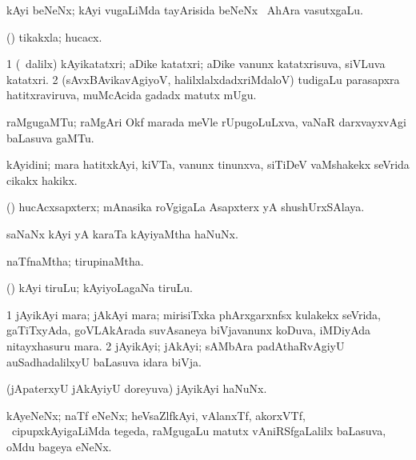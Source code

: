 \bentry
{}
\gl{\nA}
\bmng
kAyi beNeNx; kAyi \mo vugaLiMda tayArisida beNeNx \mo\ AhAra vasutxgaLu. 
\emng
\eentry

\bentry
{}
\gl{\nA}
\bmng
(\ashi) tikakxla; hucacx. 
\emng
\eentry

\bentry
{}
\gl{\nA}
\bmng
\bnum
\num{1} (\sA\ \bava dalilx) kAyikatatxri; aDike katatxri; aDike \mo vanunx katatxrisuva, siVLuva katatxri.  
\num{2} (sAvxBAvikavAgiyoV, halilxlalxdadxriMdaloV) tudigaLu parasapxra hatitxraviruva, muMcAcida gadadx matutx mUgu. 
\enum
\emng
\eentry

\bentry
{}
\gl{\nA}
\bmng
raMgugaMTu; raMgAri Okf marada meVle rUpugoLuLxva, vaNaR darxvayxvAgi baLasuva gaMTu. 
\emng
\eentry

\bentry
{}
\gl{\nA}
\bmng
kAyidini; mara hatitxkAyi, kiVTa, \mo vanunx tinunxva, siTiDeV vaMshakekx seVrida cikakx hakikx.  
\emng
\eentry

\bentry
{}
\gl{\nA}
\bmng
(\ashi) hucAcxsapxterx; mAnasika roVgigaLa Asapxterx yA shushUrxSAlaya. 
\emng
\eentry

\bentry
{}
\gl{\nA}
\bmng
saNaNx kAyi yA karaTa kAyiyaMtha haNuNx. 
\emng
\eentry

\bentry
{}
\gl{\gu}
\bmng
naTfnaMtha; tirupinaMtha. 
\emng
\eentry

\bentry
{}
\gl{\nA}
\bmng
(\ame) kAyi tiruLu; kAyiyoLagaNa tiruLu. 
\emng
\eentry

\bentry
{}
\gl{\nA}
\bmng
\bnum
\num{1} jAyikAyi mara; jAkAyi mara; mirisiTxka phArxgarxnfsx kulakekx seVrida, gaTiTxyAda, goVLAkArada suvAsaneya biVjavanunx koDuva, iMDiyAda nitayxhasuru mara. 
\num{2} jAyikAyi; jAkAyi; sAMbAra padAthaRvAgiyU auSadhadalilxyU baLasuva idara biVja. 
\enum
\emng
\eentry

\bentry
{}
\gl{\nA}
\bmng
(jApaterxyU jAkAyiyU doreyuva) jAyikAyi haNuNx. 
\emng
\eentry

\bentry
{}
\gl{\nA}
\bmng
kAyeNeNx; naTf eNeNx; heVsaZlfkAyi, vAlanxTf, akorxVTf, \mo\ cipupxkAyigaLiMda tegeda, raMgugaLu matutx vAniRSfgaLalilx baLasuva, oMdu bageya eNeNx. 
\emng
\eentry 

